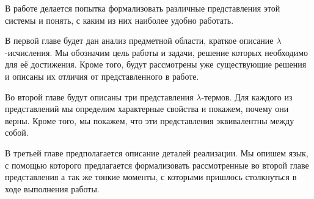 В работе делается попытка формализовать различные представления этой системы и понять, с каким из них наиболее удобно работать.

В первой главе будет дан анализ предметной области, краткое описание $\lambda$-исчисления. Мы обозначим цель работы и задачи, решение которых необходимо для её достижения. Кроме того, будут рассмотрены уже существующие решения и описаны их отличия от представленного в работе.

Во второй главе будут описаны три представления $\lambda$-термов. Для каждого из представлений мы определим характерные свойства и покажем, почему они верны. Кроме того, мы покажем, что эти представления эквивалентны между собой.

В третьей главе предполагается описание деталей реализации. Мы опишем язык, с помощью которого предлагается формализовать рассмотренные во второй главе представления а так же тонкие моменты, с которыми пришлось столкнуться в ходе выполнения работы.
